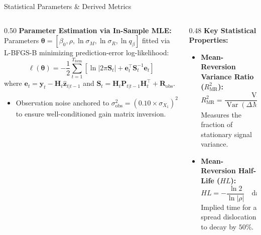 \documentclass[10pt, aspectratio=169]{beamer}
\newcommand{\Var}{\operatorname{Var}}
\begin{document}
\begin{frame}{Statistical Parameters \& Derived Metrics}
  \begin{columns}[T]
    \begin{column}{0.50\textwidth}
      \textbf{Parameter Estimation via In-Sample MLE:}
      Parameters $\bm{\theta} = [\beta_0, \rho, \ln\sigma_M, \ln\sigma_R, \ln q_\beta]$ fitted via L-BFGS-B minimizing prediction-error log-likelihood:
      \[
        \ell(\bm{\theta}) = -\frac{1}{2}\sum_{t=1}^{T_{\text{form}}} \left[ \ln|2\pi \bm{S}_t| + \bm{e}_t^\top \bm{S}_t^{-1} \bm{e}_t \right]
      \]
      where $\bm{e}_t = \bm{y}_t - \bm{H}_t \hat{\bm{z}}_{t|t-1}$ and $\bm{S}_t = \bm{H}_t \bm{P}_{t|t-1} \bm{H}_t^\top + \bm{R}_{\text{obs}}$.
      \vspace{4pt}
      \begin{itemize}
        \item Observation noise anchored to $\sigma_{\text{obs}}^2 = (0.10 \times \sigma_{X_1})^2$ to ensure well-conditioned gain matrix inversion.
      \end{itemize}
    \end{column}
    \begin{column}{0.48\textwidth}
      \textbf{Key Statistical Properties:}
      \begin{itemize}
        \item \textbf{Mean-Reversion Variance Ratio ($R^2_{\text{MR}}$):}
        \[
          R^2_{\text{MR}} = \frac{\Var(\Delta M_t)}{\Var(\Delta M_t) + \Var(\Delta R_t)} = \frac{2\sigma_M^2}{2\sigma_M^2 + (1+\rho)\sigma_R^2}
        \]
        Measures the fraction of stationary signal variance.
        \item \textbf{Mean-Reversion Half-Life ($HL$):}
        \[
          HL = -\frac{\ln 2}{\ln |\rho|} \quad \text{days}
        \]
        Implied time for a spread dislocation to decay by $50\%$.
      \end{itemize}
    \end{column}
  \end{columns}
\end{frame}
\end{document}

